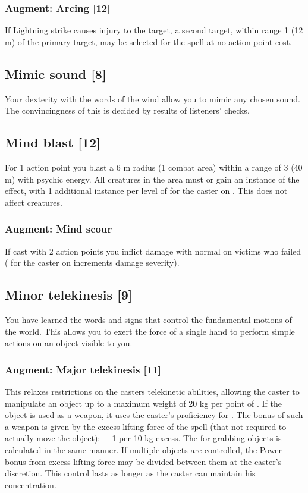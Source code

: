 \subsubsection{Augment: Arcing [12]}
If Lightning strike causes injury to the target, a second target, within range 1 (12 m) of the primary target, may be selected for the spell at no action point cost. 


\subsection{Mimic sound [8]}
Your dexterity with the words of the wind allow you to mimic any chosen sound. The convincingness of this is decided by results of listeners'  checks.


\subsection{Mind blast [12]}
For 1 action point you blast a 6 m radius (1 combat area) within a range of 3 (40 m) with psychic energy. All creatures in the area must  or gain an instance of the  effect, with 1 additional instance per level of  for the caster on . This does not affect  creatures.
\subsubsection{Augment: Mind scour}
If cast with 2 action points you inflict damage with normal  on victims who failed  ( for the caster on  increments damage severity).


\subsection{Minor telekinesis [9]}
\label{spell:min-tele}
You have learned the words and signs that control the fundamental motions of the world. This allows you to exert the force of a single hand to perform simple actions on an object visible to you.
\subsubsection{Augment: Major telekinesis [11]}
This relaxes restrictions on the casters telekinetic abilities, allowing the caster to manipulate an object up to a maximum weight of 20 kg per point of . If the object is used as a weapon, it uses the caster's  proficiency for . The bonus  of such a weapon is given by the excess lifting force of the spell (that not required to actually move the object):  + 1 per 10 kg excess. The  for grabbing objects is calculated in the same manner. If multiple objects are controlled, the Power bonus from excess lifting force may be divided between them at the caster's discretion. This control lasts as longer as the caster can maintain his concentration.


